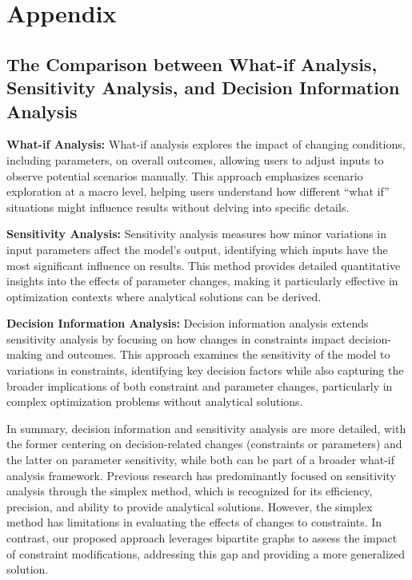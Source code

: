 \section{Appendix}

\subsection{The Comparison between What-if Analysis, Sensitivity Analysis, and Decision Information Analysis}
\label{appendix:concepts}
\textbf{What-if Analysis:} What-if analysis explores the impact of changing conditions, including parameters, on overall outcomes, allowing users to adjust inputs to observe potential scenarios manually. This approach emphasizes scenario exploration at a macro level, helping users understand how different ``what if'' situations might influence results without delving into specific details.

\textbf{Sensitivity Analysis:} Sensitivity analysis measures how minor variations in input parameters affect the model's output, identifying which inputs have the most significant influence on results. This method provides detailed quantitative insights into the effects of parameter changes, making it particularly effective in optimization contexts where analytical solutions can be derived.

\textbf{Decision Information Analysis:} Decision information analysis extends sensitivity analysis by focusing on how changes in constraints impact decision-making and outcomes. This approach examines the sensitivity of the model to variations in constraints, identifying key decision factors while also capturing the broader implications of both constraint and parameter changes, particularly in complex optimization problems without analytical solutions.

In summary, decision information and sensitivity analysis are more detailed, with the former centering on decision-related changes (constraints or parameters) and the latter on parameter sensitivity, while both can be part of a broader what-if analysis framework. Previous research has predominantly focused on sensitivity analysis through the simplex method, which is recognized for its efficiency, precision, and ability to provide analytical solutions. However, the simplex method has limitations in evaluating the effects of changes to constraints. In contrast, our proposed approach leverages bipartite graphs to assess the impact of constraint modifications, addressing this gap and providing a more generalized solution.

